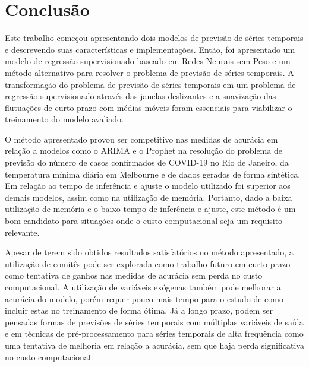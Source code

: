 \chapter{Conclusão}
\label{chap:06}

Este trabalho começou apresentando dois modelos de previsão de séries temporais e descrevendo suas características e implementações. Então, foi apresentado um modelo de regressão supervisionado baseado em Redes Neurais sem Peso e um método alternativo para resolver o problema de previsão de séries temporais. A transformação do problema de previsão de séries temporais em um problema de regressão supervisionado através das janelas deslizantes e a suavização das flutuações de curto prazo com médias móveis foram essenciais para viabilizar o treinamento do modelo avaliado.

O método apresentado provou ser competitivo nas medidas de acurácia em relação a modelos como o ARIMA e o Prophet na resolução do problema de previsão do número de casos confirmados de COVID-19 no Rio de Janeiro, da temperatura mínima diária em Melbourne e de dados gerados de forma sintética. Em relação ao tempo de inferência e ajuste o modelo utilizado foi superior aos demais modelos, assim como na utilização de memória. Portanto, dado a baixa utilização de memória e o baixo tempo de inferência e ajuste, este método é um bom candidato para situações onde o custo computacional seja um requisito relevante.

Apesar de terem sido obtidos resultados satisfatórios no método apresentado, a utilização de comitês pode ser explorada como trabalho futuro em curto prazo como tentativa de ganhos nas medidas de acurácia sem perda no custo computacional. A utilização de variáveis exógenas também pode melhorar a acurácia do modelo, porém requer pouco mais tempo para o estudo de como incluir estas no treinamento de forma ótima. Já a longo prazo, podem ser pensadas formas de previsões de séries temporais com múltiplas variáveis de saída e em técnicas de pré-processamento para séries temporais de alta frequência como uma tentativa de melhoria em relação a acurácia, sem que haja perda significativa no custo computacional.
